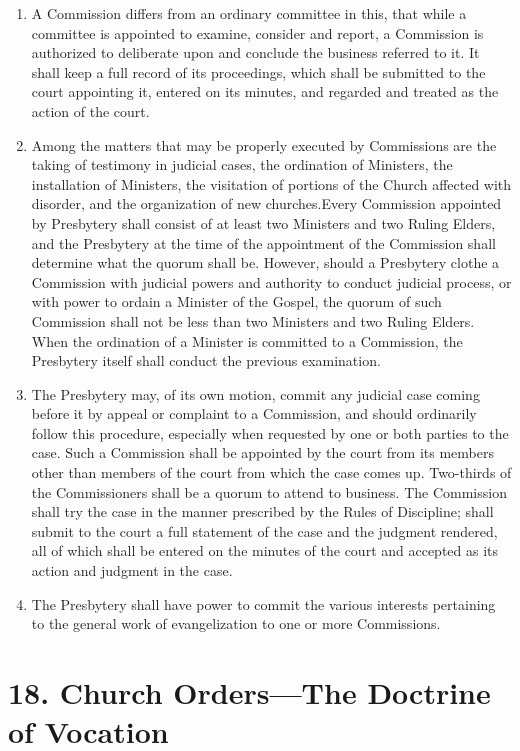 \documentclass[
]{book}
\providecommand{\tightlist}{%
  \setlength{\itemsep}{0pt}\setlength{\parskip}{0pt}}
\begin{document}
\begin{enumerate}
\def\labelenumi{\arabic{enumi}.}
\tightlist
\item
  \protect\hypertarget{17.1}{\href{}{}}A Commission differs from an ordinary committee in this, that while a committee is appointed to examine, consider and report, a Commission is authorized to deliberate upon and conclude the business referred to it. It shall keep a full record of its proceedings, which shall be submitted to the court appointing it, entered on its minutes, and regarded and treated as the action of the court.
\item
  Among the matters that may be properly executed by Commissions are the taking of testimony in judicial cases, the ordination of Ministers, the installation of Ministers, the visitation of portions of the Church affected with disorder, and the organization of new churches.Every Commission appointed by Presbytery shall consist of at least two Ministers and two Ruling Elders, and the Presbytery at the time of the appointment of the Commission shall determine what the quorum shall be. However, should a Presbytery clothe a Commission with judicial powers and authority to conduct judicial process, or with power to ordain a Minister of the Gospel, the quorum of such Commission shall not be less than two Ministers and two Ruling Elders. When the ordination of a Minister is committed to a Commission, the Presbytery itself shall conduct the previous examination.
\item
  The Presbytery may, of its own motion, commit any judicial case coming before it by appeal or complaint to a Commission, and should ordinarily follow this procedure, especially when requested by one or both parties to the case. Such a Commission shall be appointed by the court from its members other than members of the court from which the case comes up. Two-thirds of the Commissioners shall be a quorum to attend to business. The Commission shall try the case in the manner prescribed by the Rules of Discipline; shall submit to the court a full statement of the case and the judgment rendered, all of which shall be entered on the minutes of the court and accepted as its action and judgment in the case.
\item
  The Presbytery shall have power to commit the various interests pertaining to the general work of evangelization to one or more Commissions.
\end{enumerate}

\hypertarget{church-ordersthe-doctrine-of-vocation}{%
\section*{18. Church Orders---The Doctrine of Vocation}\label{church-ordersthe-doctrine-of-vocation}}
\end{document}
